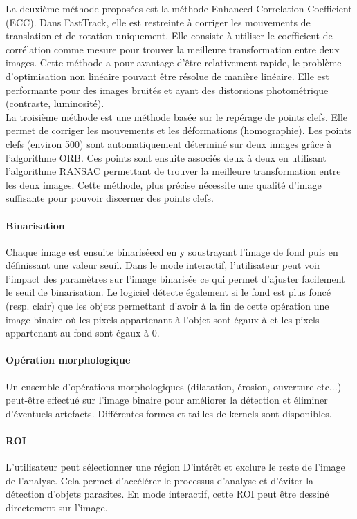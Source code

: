 		La deuxième méthode proposées est la méthode Enhanced Correlation Coefficient (ECC). Dans FastTrack, elle est restreinte à corriger les mouvements de translation et de rotation uniquement. Elle consiste à utiliser le coefficient de corrélation comme mesure pour trouver la meilleure transformation entre deux images. Cette méthode a pour avantage d'être relativement rapide, le problème d'optimisation non linéaire pouvant être résolue de manière linéaire. Elle est performante pour des images bruités et ayant des distorsions photométrique (contraste, luminosité).\\
		
		La troisième méthode est une méthode basée sur le repérage de points clefs. Elle permet de corriger les mouvements et les déformations (homographie). Les points clefs (environ 500) sont automatiquement déterminé sur deux images grâce à l'algorithme ORB. Ces points sont ensuite associés deux à deux en utilisant l’algorithme RANSAC permettant de trouver la meilleure transformation entre les deux images. Cette méthode, plus précise nécessite une qualité d'image suffisante pour pouvoir discerner des points clefs.
		
		
		\paragraph{Binarisation}
		Chaque image est ensuite binariséecd  en y soustrayant l'image de fond puis en définissant une valeur seuil. Dans le mode interactif, l'utilisateur peut voir l'impact des paramètres sur l'image binarisée ce qui permet d'ajuster facilement le seuil de binarisation. Le logiciel détecte également si le fond est plus foncé (resp. clair) que les objets permettant d'avoir à la fin de cette opération une image binaire  où les pixels appartenant à l’objet sont égaux à  et les pixels appartenant au fond sont égaux à 0.
		
		
		\paragraph{Opération morphologique}
		Un ensemble d'opérations morphologiques (dilatation, érosion, ouverture etc...) peut-être effectué sur l'image binaire pour améliorer la détection et éliminer d'éventuels artefacts. Différentes formes et tailles de kernels sont disponibles.
		
		
		\paragraph{ROI}
		L'utilisateur peut sélectionner une région D’intérêt et exclure le reste de l'image de l'analyse. Cela permet d'accélérer le processus d'analyse et d'éviter la détection d’objets parasites. En mode interactif, cette ROI peut être dessiné directement sur l'image.
		

